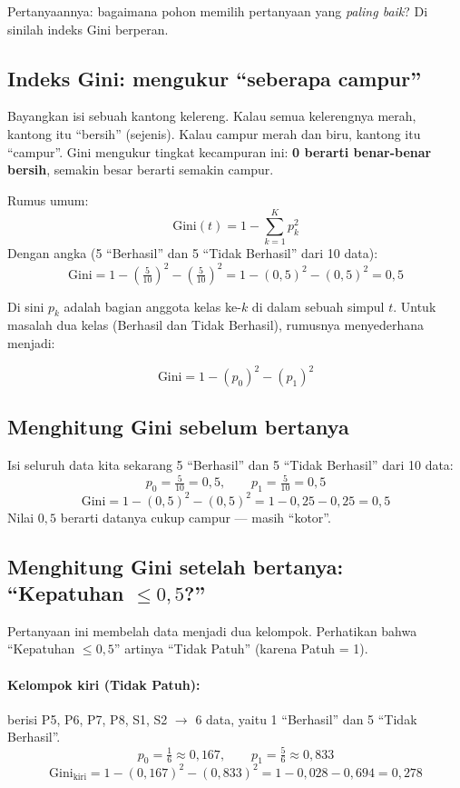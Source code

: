 \documentclass[11pt,a4paper]{article}
\begin{document}
Pertanyaannya: bagaimana pohon memilih pertanyaan yang \emph{paling baik}? Di sinilah indeks
Gini berperan.

\subsection{Indeks Gini: mengukur ``seberapa campur''}

Bayangkan isi sebuah kantong kelereng. Kalau semua kelerengnya merah, kantong itu ``bersih''
(sejenis). Kalau campur merah dan biru, kantong itu ``campur''. Gini mengukur tingkat
kecampuran ini: \textbf{0 berarti benar-benar bersih}, semakin besar berarti semakin campur.

\begin{rumus}
Rumus umum:
\[ \text{Gini}(t) = 1 - \sum_{k=1}^{K} p_k^2 \]
Dengan angka (5 ``Berhasil'' dan 5 ``Tidak Berhasil'' dari 10 data):
\[ \text{Gini} = 1 - \left(\tfrac{5}{10}\right)^2 - \left(\tfrac{5}{10}\right)^2 = 1 - (0{,}5)^2 - (0{,}5)^2 = 0{,}5 \]
\end{rumus}

\noindent Di sini $p_k$ adalah bagian anggota kelas ke-$k$ di dalam sebuah simpul $t$. Untuk
masalah dua kelas (Berhasil dan Tidak Berhasil), rumusnya menyederhana menjadi:

\[ \text{Gini} = 1 - (p_0)^2 - (p_1)^2 \]

\subsection{Menghitung Gini sebelum bertanya}

Isi seluruh data kita sekarang 5 ``Berhasil'' dan 5 ``Tidak Berhasil'' dari 10 data:
\[ p_0 = \tfrac{5}{10} = 0{,}5, \qquad p_1 = \tfrac{5}{10} = 0{,}5 \]
\[
\text{Gini} = 1 - (0{,}5)^2 - (0{,}5)^2 = 1 - 0{,}25 - 0{,}25 = 0{,}5
\]
Nilai $0{,}5$ berarti datanya cukup campur --- masih ``kotor''.

\subsection{Menghitung Gini setelah bertanya: ``Kepatuhan $\le 0{,}5$?''}

Pertanyaan ini membelah data menjadi dua kelompok. Perhatikan bahwa ``Kepatuhan $\le 0{,}5$''
artinya ``Tidak Patuh'' (karena Patuh = 1).

\paragraph{Kelompok kiri (Tidak Patuh):} berisi P5, P6, P7, P8, S1, S2 $\to$ 6 data, yaitu
1 ``Berhasil'' dan 5 ``Tidak Berhasil''.
\[ p_0 = \tfrac{1}{6} \approx 0{,}167, \qquad p_1 = \tfrac{5}{6} \approx 0{,}833 \]
\[
\text{Gini}_{\text{kiri}} = 1 - (0{,}167)^2 - (0{,}833)^2 = 1 - 0{,}028 - 0{,}694 = 0{,}278
\]
\end{document}

